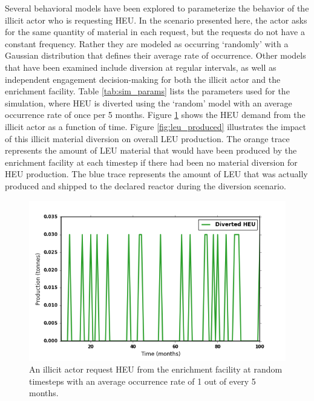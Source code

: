 Several behavioral models have been explored to parameterize the behavior of the illicit actor who is requesting \gls{HEU}.   In the scenario presented here, the actor asks for the same quantity of material in each request, but the requests do not have a constant frequency. Rather they are modeled as occurring `randomly' with a Gaussian distribution that defines their average rate of occurrence.  Other models that have been examined include diversion at regular intervals, as well as independent engagement decision-making for both the illicit actor and the enrichment facility.  Table \ref{tab:sim_params} lists the parameters used for the simulation, where \gls{HEU} is diverted using the `random' model with an average occurrence rate of once per 5 months.  Figure \ref{fig:heu_demand} shows the \gls{HEU} demand from the illicit actor as a function of time.  Figure \ref{fig:leu_produced} illustrates the impact of this illicit material diversion on overall \gls{LEU} production.  The orange trace represents the amount of \gls{LEU} material that would have been produced by the enrichment facility at each timestep if there had been no material diversion for \gls{HEU} production.  The blue trace represents the amount of \gls{LEU} that was actually produced and shipped to the declared reactor during the diversion scenario.


\begin{figure}
\begin{center}
\includegraphics[natwidth=162bp,natheight=227bp, scale=0.7]{./figs/HEU_R5.png}
\end{center}
\caption{An illicit actor request \gls{HEU} from the enrichment facility at random timesteps with an average occurrence rate of 1 out of every 5 months.}
\label{fig:heu_demand}
\end{figure}

